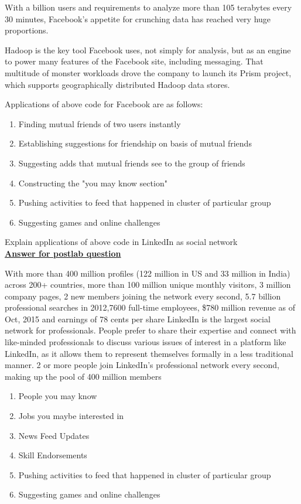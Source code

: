 \documentclass[11pt,article]{memoir}
\begin{document}
\begin{flushleft}
With a billion users and requirements to analyze more than 105 terabytes every 30 minutes, Facebook's appetite for crunching data has reached very huge proportions.

Hadoop is the key tool Facebook uses, not simply for analysis, but as an engine to power many features of the Facebook site, including messaging. That multitude of monster workloads drove the company to launch its Prism project, which supports geographically distributed Hadoop data stores.

\noindent Applications of above code for Facebook are as follows:

\begin{enumerate}
	\item Finding mutual friends of two users instantly
	\item Establishing suggestions for friendship on basis of mutual friends
	\item Suggesting adds that mutual friends see to the group of friends
	\item Constructing the "you may know section"
	\item Pushing activities to feed that happened in cluster of particular group
	\item Suggesting games and online challenges
\end{enumerate}
                        
\newpage
Explain applications of above code in LinkedIn as social network\\
\textbf{\underline{Answer for postlab question}}

With more than 400 million profiles (122 million in US and 33 million in India) across 200+ countries, more than 100 million unique monthly visitors, 3 million company pages, 2 new members joining the network every second, 5.7 billion professional searches in 2012,7600 full-time employees, \$780 million revenue as of Oct, 2015 and earnings of 78 cents per share LinkedIn is the largest social network for professionals. People prefer to share their expertise and connect with like-minded professionals to discuss various issues of interest in a platform like LinkedIn, as it allows them to represent themselves formally in a less traditional manner. 2 or more people join LinkedIn’s professional network every second, making up the pool of 400 million members

\begin{enumerate}
	\item People you may know
	\item Jobs you maybe interested in
	\item News Feed Updates
	\item Skill Endorsements
	\item Pushing activities to feed that happened in cluster of particular group
	\item Suggesting games and online challenges
\end{enumerate}
    

\end{flushleft}
\end{document}
